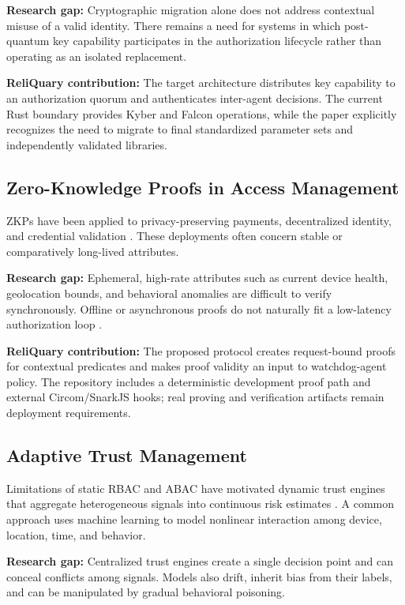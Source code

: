 \documentclass[10pt]{article}
\let\cite\citep
\begin{document}
\textbf{Research gap:} Cryptographic migration alone does not address contextual misuse of a valid identity. There remains a need for systems in which post-quantum key capability participates in the authorization lifecycle rather than operating as an isolated replacement.

\textbf{ReliQuary contribution:} The target architecture distributes key capability to an authorization quorum and authenticates inter-agent decisions. The current Rust boundary provides Kyber and Falcon operations, while the paper explicitly recognizes the need to migrate to final standardized parameter sets and independently validated libraries.

\subsection*{Zero-Knowledge Proofs in Access Management}

ZKPs have been applied to privacy-preserving payments, decentralized identity, and credential validation \cite{zerocash2014,didcore}. These deployments often concern stable or comparatively long-lived attributes.

\textbf{Research gap:} Ephemeral, high-rate attributes such as current device health, geolocation bounds, and behavioral anomalies are difficult to verify synchronously. Offline or asynchronous proofs do not naturally fit a low-latency authorization loop \cite{zkpsurvey}.

\textbf{ReliQuary contribution:} The proposed protocol creates request-bound proofs for contextual predicates and makes proof validity an input to watchdog-agent policy. The repository includes a deterministic development proof path and external Circom/SnarkJS hooks; real proving and verification artifacts remain deployment requirements.

\subsection*{Adaptive Trust Management}

Limitations of static RBAC and ABAC have motivated dynamic trust engines that aggregate heterogeneous signals into continuous risk estimates \cite{rbac2000,abac2014,ucon,mltrust}. A common approach uses machine learning to model nonlinear interaction among device, location, time, and behavior.

\textbf{Research gap:} Centralized trust engines create a single decision point and can conceal conflicts among signals. Models also drift, inherit bias from their labels, and can be manipulated by gradual behavioral poisoning.
\end{document}
